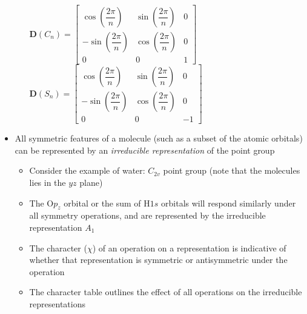\documentclass[12pt, openany, letterpaper]{memoir}
\begin{document}
\begin{itemize}
\begin{itemize}
		$ \mathbf{D}(C_n) = 
		\begin{bmatrix}
		\cos\left(\dfrac{2\pi}{n}\right)&\sin\left(\dfrac{2\pi}{n}\right)&0\\
		-\sin\left(\dfrac{2\pi}{n}\right)&\cos\left(\dfrac{2\pi}{n}\right)&0\\
		0&0&1
		\end{bmatrix}$
		\hspace{2em} $ \mathbf{D}(S_n) = 
		\begin{bmatrix}
		\cos\left(\dfrac{2\pi}{n}\right)&\sin\left(\dfrac{2\pi}{n}\right)&0\\
		-\sin\left(\dfrac{2\pi}{n}\right)&\cos\left(\dfrac{2\pi}{n}\right)&0\\
		0&0&-1
		\end{bmatrix}$
	\end{itemize}
	\item All symmetric features of a molecule (such as a subset of the atomic orbitals) can be represented by an \emph{irreducible representation} of the point group
	\begin{itemize}
		\item Consider the example of water: $C_{2v}$ point group (note that the molecules lies in the $yz$ plane)
		\item The O$p_z$ orbital or the sum of H$1s$ orbitals will respond similarly under all symmetry operations, and are represented by the irreducible representation $A_1$		
		\item The character ($\chi$) of an operation on a representation is indicative of whether that representation is symmetric or antisymmetric under the operation
		\item The character table outlines the effect of all operations on the irreducible representations
		

\end{itemize}
\end{itemize}
\end{document}
